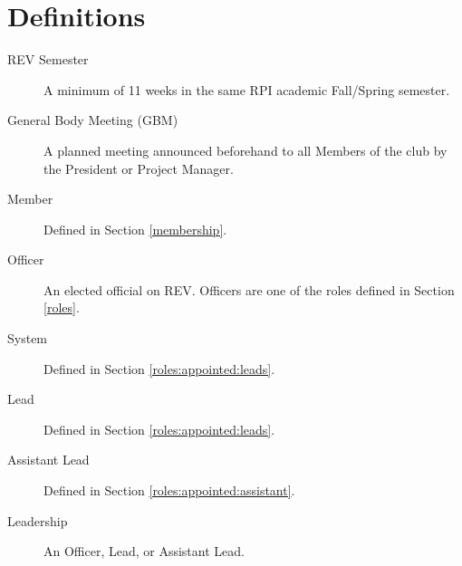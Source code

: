 \section{Definitions}
\label{definitions}
\begin{description}
\item[REV Semester] A minimum of 11 weeks in the same RPI academic Fall/Spring semester.
\item[General Body Meeting (GBM)] A planned meeting announced beforehand to all Members of the club by the President or Project Manager.
\item[Member] Defined in Section \ref{membership}.
\item[Officer] An elected official on REV. Officers are one of the roles defined in Section \ref{roles}.
\item[System] Defined in Section \ref{roles:appointed:leads}.
\item[Lead] Defined in Section \ref{roles:appointed:leads}.
\item[Assistant Lead] Defined in Section \ref{roles:appointed:assistant}.
\item[Leadership] An Officer, Lead, or Assistant Lead.
\end{description}